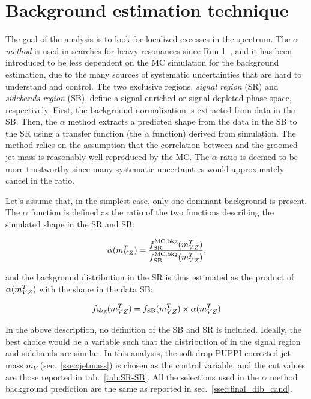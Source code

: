 \section{Background estimation technique}
\label{sec:alpha}

The goal of the analysis is to look for localized excesses in the \mtVZ spectrum. The \emph{$\alpha$ method} is used in searches for heavy resonances since Run 1~\cite{Khachatryan:2015cwa}, and it has been introduced to be less dependent on the MC simulation for the background \mtVZ estimation, due to the many sources of systematic uncertainties that are hard to understand and control. The two exclusive regions, \emph{signal region} (SR) and \emph{sidebands region} (SB), define a signal enriched or signal depleted phase space, respectively. First, the background normalization is extracted from data in the SB. Then, the $\alpha$ method extracts a predicted shape from the data in the SB to the SR using a transfer function (the $\alpha$ function) derived from simulation. The method relies on the assumption that the correlation between \mtVZ and the groomed jet mass is reasonably well reproduced by the MC. The $\alpha$-ratio is deemed to be more trustworthy since many systematic uncertainties would approximately cancel in the ratio.

\noindent Let's assume that, in the simplest case, only one dominant background is present. The $\alpha$ function is defined as the ratio of the two functions describing the simulated \mtVZ shape in the SR and SB:

\begin{equation}
\alpha(m_{VZ}^T) = \frac{f_{\text{SR}}^{\text{MC,bkg}}(m_{VZ}^T)}{f_{\text{SB}}^{\text{MC,bkg}}(m_{VZ}^T)},
\end{equation}

\noindent and the background distribution in the SR is thus estimated as the product of  $\alpha(m_{VZ}^T)$ with the shape in the data SB:

\begin{equation}
f_{\text{bkg}}(m_{VZ}^T) = f_{\text{SB}}(m_{VZ}^T) \times \alpha(m_{VZ}^T)
\end{equation}

\noindent In the above description, no definition of the SB and SR is included. Ideally, the best choice would be a variable such that the distribution of \mtVZ in the signal region and sidebands are similar. In this analysis, the soft drop PUPPI corrected jet mass $m_V$ (sec.~\ref{ssec:jetmass}) is chosen as the control variable, and the cut values are those reported in tab.~\ref{tab:SR-SB}. All the selections used in the $\alpha$ method background prediction are the same as reported in sec.~\ref{ssec:final_dib_cand}.

